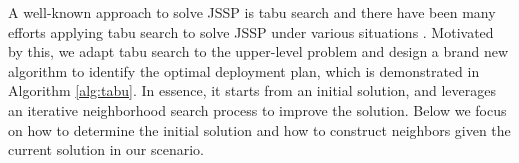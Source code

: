 % 




A well-known approach to solve JSSP is tabu search \cite{glover1990tabu,glover1998tabu,gendreau2005tabu} and there have been many efforts applying tabu search to solve JSSP under various situations \cite{hurink1994tabu,tabu_jssp_1997,zhang2007tabu}. Motivated by this, we adapt tabu search to the upper-level problem and design a brand new algorithm to identify the optimal deployment plan, which is demonstrated in Algorithm \ref{alg:tabu}. 
In essence, it starts from an initial solution, and leverages an iterative neighborhood search process to improve the solution. 
Below we focus on how to determine the initial solution and how to construct neighbors given the current solution in our scenario.


